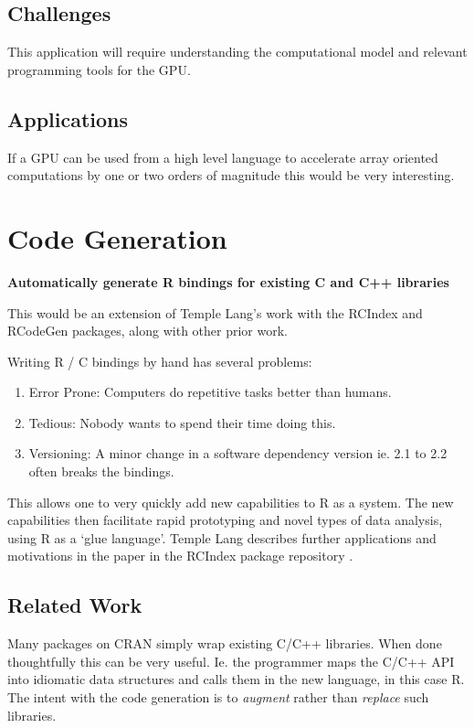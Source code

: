 \documentclass[12pt]{article}
\begin{document}
\subsection{Challenges}

This application will require understanding the computational model and
relevant programming tools for the GPU.

\subsection{Applications}

If a GPU can be used from a high level language to accelerate array
oriented computations by one or two orders of magnitude this would be very
interesting.

\section{Code Generation}

\textbf{Automatically generate R bindings for existing C and C++ libraries}

This would be an extension of Temple Lang's
work with the RCIndex \cite{R-RCIndex} and RCodeGen \cite{R-RCodegen}
packages, along with other prior work.

Writing R / C bindings by hand has several problems: 
\begin{enumerate}
    \item{Error Prone:} Computers do repetitive tasks better than humans.
    \item{Tedious:} Nobody wants to spend their time doing this.
    \item{Versioning:} A minor change in a software dependency version ie. 2.1
        to 2.2 often breaks the bindings.
\end{enumerate}

This allows one to very quickly add new
capabilities to R as a system. The new capabilities then facilitate rapid
prototyping and novel types of data analysis, using R as a `glue language'.
Temple Lang describes further applications and motivations in the paper in
the RCIndex package repository \cite{R-RCIndex}.

\subsection{Related Work}

Many packages on CRAN simply wrap existing C/C++ libraries. When done
thoughtfully this can be very useful. Ie. the programmer maps the C/C++ API
into idiomatic data structures and calls them in the new language, in this
case R.  The intent with the code generation is to \emph{augment} rather
than \emph{replace} such libraries. 
\end{document}
